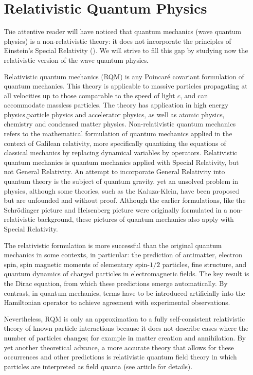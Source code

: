 	\newpage
	\thispagestyle{empty}
	\mbox{}
   	\section{Relativistic Quantum Physics}
   	\lettrine[lines=4]{\color{BrickRed}T}he attentive reader will have noticed that quantum mechanics (wave quantum physics) is a non-relativistic theory: it does not incorporate the principles of Einstein's Special Relativity (). We will strive to fill this gap by studying now the relativistic version of the wave quantum physics.
   	
   	 Relativistic quantum mechanics (RQM) is any Poincaré covariant formulation of quantum mechanics. This theory is applicable to massive particles propagating at all velocities up to those comparable to the speed of light $c$, and can accommodate massless particles. The theory has application in high energy physics,particle physics and accelerator physics, as well as atomic physics, chemistry and condensed matter physics. Non-relativistic quantum mechanics refers to the mathematical formulation of quantum mechanics applied in the context of Galilean relativity, more specifically quantizing the equations of classical mechanics by replacing dynamical variables by operators. Relativistic quantum mechanics is quantum mechanics applied with Special Relativity, but not General Relativity. An attempt to incorporate General Relativity into quantum theory is the subject of quantum gravity, yet an unsolved problem in physics, although some theories, such as the Kaluza-Klein, have been proposed but are unfounded and without proof. Although the earlier formulations, like the Schrödinger picture and Heisenberg picture were originally formulated in a non-relativistic background, these pictures of quantum mechanics also apply with Special Relativity.

	The relativistic formulation is more successful than the original quantum mechanics in some contexts, in particular: the prediction of antimatter, electron spin, spin magnetic moments of elementary spin-$1/2$ particles, fine structure, and quantum dynamics of charged particles in electromagnetic fields. The key result is the Dirac equation, from which these predictions emerge automatically. By contrast, in quantum mechanics, terms have to be introduced artificially into the Hamiltonian operator to achieve agreement with experimental observations.

	Nevertheless, RQM is only an approximation to a fully self-consistent relativistic theory of known particle interactions because it does not describe cases where the number of particles changes; for example in matter creation and annihilation. By yet another theoretical advance, a more accurate theory that allows for these occurrences and other predictions is relativistic quantum field theory in which particles are interpreted as field quanta (see article for details).
   	
